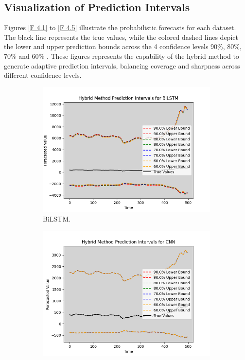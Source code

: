 \subsection{Visualization of Prediction Intervals}
Figures \ref{F 4.1} to \ref{F 4.5} illustrate the probabilistic forecasts for each dataset. The black line represents the true values, while the colored dashed lines depict the lower and upper prediction bounds across the 4 confidence levels 90\%, 80\%, 70\% and 60\% . These figures represents the capability of the hybrid method to generate adaptive prediction intervals, balancing coverage and sharpness across different confidence levels.

\begin{figure}[H]
    \centering
    \begin{minipage}{0.45\textwidth}
        \centering
        \begin{subfigure}[b]{\textwidth}
            \centering
            \includegraphics[width=\textwidth]{Chap03/figs/BiLSTM_hybrid_method_plot_AdaniPorts_Method2.png}
            \caption{BiLSTM.}
        \end{subfigure}
        \hfill
        \begin{subfigure}[b]{\textwidth}
            \centering
            \includegraphics[width=\textwidth]{Chap03/figs/CNN_hybrid_method_plot_AdaniPorts_Method2.png}

\end{subfigure}
\end{minipage}
\end{figure}
